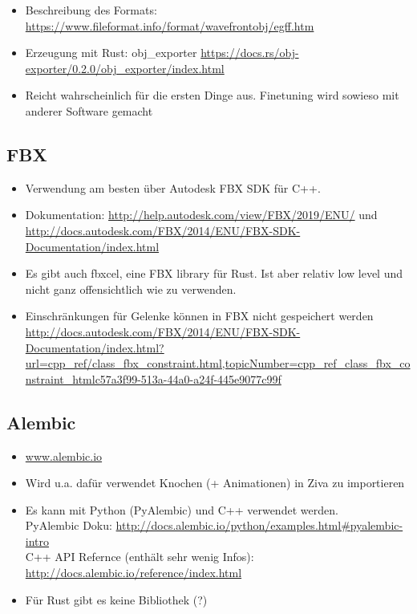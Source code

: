 \begin{itemize}
 \item Beschreibung des Formats: \url{https://www.fileformat.info/format/wavefrontobj/egff.htm}
 \item Erzeugung mit Rust: obj\_exporter \url{https://docs.rs/obj-exporter/0.2.0/obj_exporter/index.html}
 \item Reicht wahrscheinlich für die ersten Dinge aus. Finetuning wird sowieso mit anderer Software gemacht
\end{itemize}

\subsection{FBX}

\begin{itemize}
 \item Verwendung am besten über Autodesk FBX SDK für C++. 
 \item Dokumentation: \url{http://help.autodesk.com/view/FBX/2019/ENU/} und \url{http://docs.autodesk.com/FBX/2014/ENU/FBX-SDK-Documentation/index.html}
 \item Es gibt auch fbxcel, eine FBX library für Rust. Ist aber relativ low level und nicht ganz offensichtlich wie zu verwenden.
 \item Einschränkungen für Gelenke können in FBX nicht gespeichert werden \url{http://docs.autodesk.com/FBX/2014/ENU/FBX-SDK-Documentation/index.html?url=cpp_ref/class_fbx_constraint.html,topicNumber=cpp_ref_class_fbx_constraint_htmlc57a3f99-513a-44a0-a24f-445e9077c99f}
\end{itemize}

\subsection{Alembic}

\begin{itemize}
 \item \url{www.alembic.io}
 \item Wird u.a. dafür verwendet Knochen (+ Animationen) in Ziva zu importieren
 \item Es kann mit Python (PyAlembic) und C++ verwendet werden.\\
 PyAlembic Doku: \url{http://docs.alembic.io/python/examples.html#pyalembic-intro}\\
 C++ API Refernce (enthält sehr wenig Infos): \url{http://docs.alembic.io/reference/index.html}
 \item Für Rust gibt es keine Bibliothek (?)
\end{itemize}


